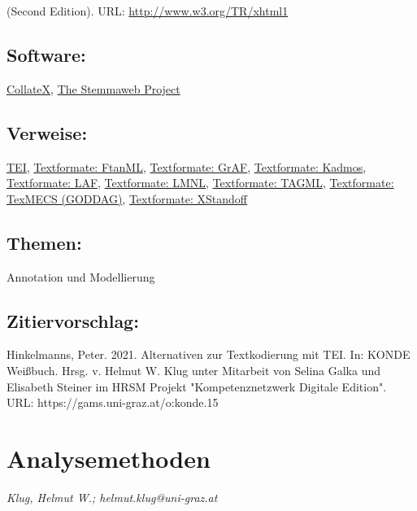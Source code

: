 \documentclass{article}
\begin{document}
\begin{itemize}
                              (Second Edition). URL: \url{http://www.w3.org/TR/xhtml1}\end{itemize}\subsection*{Software:}\href{https://collatex.net}{CollateX}, \href{https://stemmaweb.net/}{The Stemmaweb
                           Project}\subsection*{Verweise:}\href{https://gams.uni-graz.at/o:konde.178}{TEI}, \href{https://gams.uni-graz.at/o:konde.184}{Textformate: FtanML}, \href{https://gams.uni-graz.at/o:konde.185}{Textformate: GrAF}, \href{https://gams.uni-graz.at/o:konde.186}{Textformate: Kadmos}, \href{https://gams.uni-graz.at/o:konde.187}{Textformate: LAF}, \href{https://gams.uni-graz.at/o:konde.188}{Textformate: LMNL}, \href{https://gams.uni-graz.at/o:konde.189}{Textformate: TAGML}, \href{https://gams.uni-graz.at/o:konde.190}{Textformate: TexMECS
                           (GODDAG)}, \href{https://gams.uni-graz.at/o:konde.191}{Textformate: XStandoff}\subsection*{Themen:}Annotation und Modellierung\subsection*{Zitiervorschlag:}Hinkelmanns, Peter. 2021. Alternativen zur Textkodierung mit TEI. In: KONDE Weißbuch. Hrsg. v. Helmut W. Klug unter Mitarbeit von Selina Galka und Elisabeth Steiner im HRSM Projekt "Kompetenznetzwerk Digitale Edition". URL: https://gams.uni-graz.at/o:konde.15\newpage\section*{Analysemethoden} \emph{Klug, Helmut W.; helmut.klug@uni-graz.at }\\
        
\end{document}
